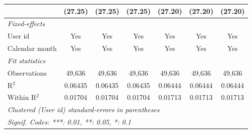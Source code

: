 \begin{table}[htbp]
\begin{footnotesize}
\begin{tabular}{lcccccc}
                                     & (27.25)        & (27.25)        & (27.25)        & (27.20)        & (27.20)        & (27.20)\\
         \midrule \emph{Fixed-effects} &   &   &   &   &   &  \\
         User id                     & Yes            & Yes            & Yes            & Yes            & Yes            & Yes\\
         Calendar month              & Yes            & Yes            & Yes            & Yes            & Yes            & Yes\\
         \midrule \emph{Fit statistics} &   &   &   &   &   &  \\
         Observations                & 49,636         & 49,636         & 49,636         & 49,636         & 49,636         & 49,636\\
         R$^2$                       & 0.06435        & 0.06435        & 0.06435        & 0.06444        & 0.06444        & 0.06444\\
         Within R$^2$                & 0.01704        & 0.01704        & 0.01704        & 0.01713        & 0.01713        & 0.01713\\
         \midrule\midrule\multicolumn{7}{l}{\emph{Clustered (User id) standard-errors in parentheses}}\\
         \multicolumn{7}{l}{\emph{Signif. Codes: ***: 0.01, **: 0.05, *: 0.1}}\\
      \end{tabular}
   \end{footnotesize}
\end{table}


